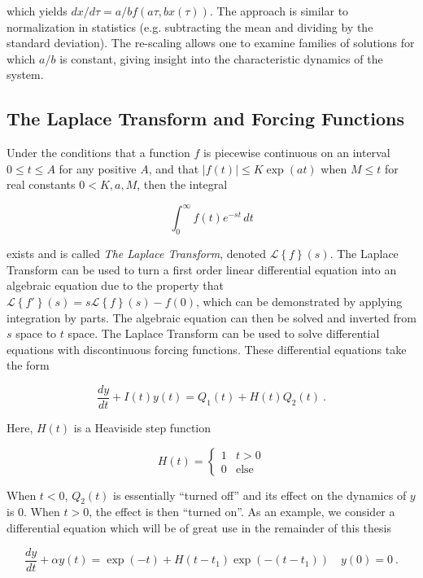 \noindent which yields $dx / d \tau = a/b f(a\tau, bx(\tau))$.  The approach is similar to normalization in statistics (e.g. subtracting the mean and dividing by the standard deviation).  The re-scaling allows one to examine families of solutions for which $a/b$ is constant, giving insight into the characteristic dynamics of the system. 


\subsection{The Laplace Transform and Forcing Functions}

Under the conditions that a function $f$ is piecewise continuous on an interval $0 \leq t \leq A$ for any positive $A$, and that $\vert f(t) \vert \leq K \exp(at)$ when $M \leq t$ for real constants $0< K, a, M $, then the integral

$$ \int_0^\infty f(t) e^{-st} \, dt  $$ 

\noindent exists and is called \textit{The Laplace Transform}, denoted $\mathcal{L}\left\{f\right\}(s)$.  The Laplace Transform can be used to turn a first order linear differential equation into an algebraic equation due to the property that  $\mathcal{L}\left\{f'\right\}(s) = s\mathcal{L}\left\{f\right\}(s) - f(0) $, which can be demonstrated by applying integration by parts. The algebraic equation can then be solved and inverted from $s$ space to $t$ space.  The Laplace Transform can be used to solve differential equations with discontinuous forcing functions.  These differential equations take the form 

\begin{equation}
	\dfrac{dy}{dt} + I(t)y(t) = Q_1(t) + H(t)Q_2(t) \>.
\end{equation}

\noindent Here, $H(t)$ is a Heaviside step function

\begin{equation}
	H(t) = \begin{cases}  1 & t>0 \\ 0 & \mbox{else} \end{cases}
\end{equation}

\noindent  When $t<0$,  $Q_2(t)$ is essentially ``turned off'' and its effect on the dynamics of $y$ is 0.  When $t>0$, the effect is then ``turned on''. As an example, we consider a differential equation which will be of great use in the remainder of this thesis

\begin{equation}
	\dfrac{dy}{dt} + \alpha y(t) = \exp(-t)  + H(t - t_1) \exp(-(t - t_1)) \quad y(0) = 0 \>.
\end{equation}

